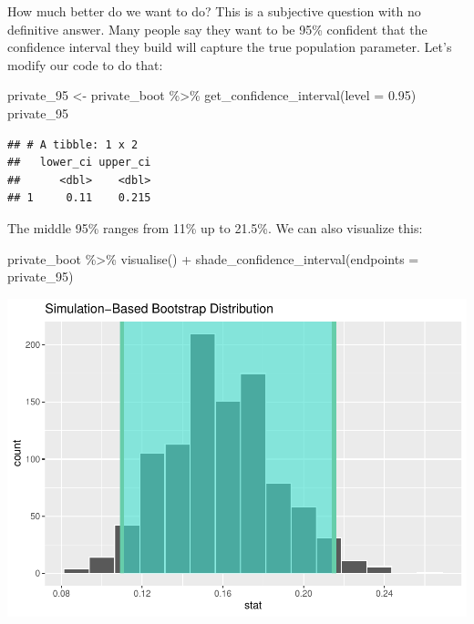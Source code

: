 \documentclass[
]{book}
\newenvironment{Shaded}{\begin{snugshade}}{\end{snugshade}}
\newcommand{\AttributeTok}[1]{\textcolor[rgb]{0.77,0.63,0.00}{#1}}
\newcommand{\FloatTok}[1]{\textcolor[rgb]{0.00,0.00,0.81}{#1}}
\newcommand{\FunctionTok}[1]{\textcolor[rgb]{0.00,0.00,0.00}{#1}}
\newcommand{\NormalTok}[1]{#1}
\newcommand{\OtherTok}[1]{\textcolor[rgb]{0.56,0.35,0.01}{#1}}
\newcommand{\SpecialCharTok}[1]{\textcolor[rgb]{0.00,0.00,0.00}{#1}}
\begin{document}
How much better do we want to do? This is a subjective question with no definitive answer. Many people say they want to be 95\% confident that the confidence interval they build will capture the true population parameter. Let's modify our code to do that:

\begin{Shaded}
\begin{Highlighting}[]
\NormalTok{private\_95 }\OtherTok{\textless{}{-}}\NormalTok{ private\_boot }\SpecialCharTok{\%\textgreater{}\%}
    \FunctionTok{get\_confidence\_interval}\NormalTok{(}\AttributeTok{level =} \FloatTok{0.95}\NormalTok{)}
\NormalTok{private\_95}
\end{Highlighting}
\end{Shaded}

\begin{verbatim}
## # A tibble: 1 x 2
##   lower_ci upper_ci
##      <dbl>    <dbl>
## 1     0.11    0.215
\end{verbatim}

The middle 95\% ranges from 11\% up to 21.5\%. We can also visualize this:

\begin{Shaded}
\begin{Highlighting}[]
\NormalTok{private\_boot }\SpecialCharTok{\%\textgreater{}\%}
    \FunctionTok{visualise}\NormalTok{() }\SpecialCharTok{+}
    \FunctionTok{shade\_confidence\_interval}\NormalTok{(}\AttributeTok{endpoints =}\NormalTok{ private\_95)}
\end{Highlighting}
\end{Shaded}

\includegraphics{intro_stats_files/figure-latex/unnamed-chunk-325-1.pdf}
\end{document}
